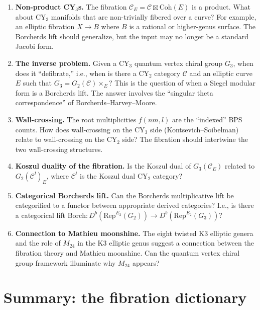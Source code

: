 \documentclass[11pt]{article}
\theoremstyle{plain}
\theoremstyle{definition}
\theoremstyle{remark}
\newcommand{\CY}{\mathrm{CY}}
\newcommand{\Rep}{\mathrm{Rep}}
\newcommand{\Coh}{\mathrm{Coh}}
\newcommand{\Etwo}{E_2}
\newcommand{\cC}{\mathcal{C}}
\begin{document}
\begin{enumerate}[label=\arabic*.]
\item \textbf{Non-product CY$_3$s.} The fibration $\cC_E = \cC \boxtimes
 \Coh(E)$ is a product. What about $\CY_3$ manifolds that are non-trivially
 fibered over a curve? For example, an elliptic fibration $X \to B$ where
 $B$ is a rational or higher-genus surface. The Borcherds lift should
 generalize, but the input may no longer be a standard Jacobi form.

\item \textbf{The inverse problem.} Given a $\CY_3$ quantum vertex chiral group
 $G_3$, when does it ``defibrate,'' i.e., when is there a $\CY_2$ category
 $\cC$ and an elliptic curve $E$ such that $G_3 = G_2(\cC) \times_E$? This
 is the question of when a Siegel modular form is a Borcherds lift. The answer
 involves the ``singular theta correspondence'' of Borcherds--Harvey--Moore.

\item \textbf{Wall-crossing.} The root multiplicities $f(nm, l)$ are the
 ``indexed'' BPS counts. How does wall-crossing on the $\CY_3$ side
 (Kontsevich--Soibelman) relate to wall-crossing on the $\CY_2$ side? The
 fibration should intertwine the two wall-crossing structures.

\item \textbf{Koszul duality of the fibration.} Is the Koszul dual of
 $G_3(\cC_E)$ related to $G_2(\cC^!)_E$, where $\cC^!$ is the Koszul dual
 $\CY_2$ category?

\item \textbf{Categorical Borcherds lift.} Can the Borcherds multiplicative
 lift be categorified to a functor between appropriate derived categories?
 I.e., is there a categorical lift
 $\mathrm{Borch} \colon D^b(\Rep^{\Etwo}(G_2)) \to D^b(\Rep^{\Etwo}(G_3))$?

\item \textbf{Connection to Mathieu moonshine.} The eight twisted K3 elliptic
 genera and the role of $M_{24}$ in the K3 elliptic genus suggest a connection
 between the fibration theory and Mathieu moonshine. Can the quantum vertex
 chiral group framework illuminate why $M_{24}$ appears?
\end{enumerate}

\section{Summary: the fibration dictionary}
\label{sec:fib-summary}
\end{document}
